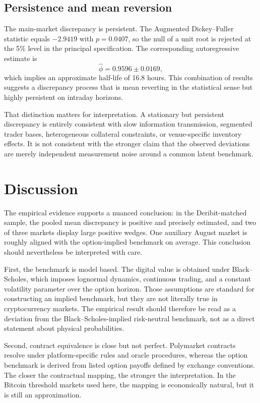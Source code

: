 \documentclass[11pt]{article}
\numberwithin{equation}{section}
\theoremstyle{plain}
\begin{document}
\subsection{Persistence and mean reversion}
The main-market discrepancy is persistent. The Augmented Dickey--Fuller statistic equals $-2.9419$ with $p=0.0407$, so the null of a unit root is rejected at the 5\% level in the principal specification. The corresponding autoregressive estimate is
\[
\hat{\phi}=0.9596 \pm 0.0169,
\]
which implies an approximate half-life of 16.8 hours. This combination of results suggests a discrepancy process that is mean reverting in the statistical sense but highly persistent on intraday horizons.

That distinction matters for interpretation. A stationary but persistent discrepancy is entirely consistent with slow information transmission, segmented trader bases, heterogeneous collateral constraints, or venue-specific inventory effects. It is not consistent with the stronger claim that the observed deviations are merely independent measurement noise around a common latent benchmark.

\section{Discussion}
The empirical evidence supports a nuanced conclusion: in the Deribit-matched sample, the pooled mean discrepancy is positive and precisely estimated, and two of three markets display large positive wedges. One auxiliary August market is roughly aligned with the option-implied benchmark on average. This conclusion should nevertheless be interpreted with care.

First, the benchmark is model based. The digital value is obtained under Black--Scholes, which imposes lognormal dynamics, continuous trading, and a constant volatility parameter over the option horizon. Those assumptions are standard for constructing an implied benchmark, but they are not literally true in cryptocurrency markets. The empirical result should therefore be read as a deviation from the Black--Scholes-implied risk-neutral benchmark, not as a direct statement about physical probabilities.

Second, contract equivalence is close but not perfect. Polymarket contracts resolve under platform-specific rules and oracle procedures, whereas the option benchmark is derived from listed option payoffs defined by exchange conventions. The closer the contractual mapping, the stronger the interpretation. In the Bitcoin threshold markets used here, the mapping is economically natural, but it is still an approximation.
\end{document}
